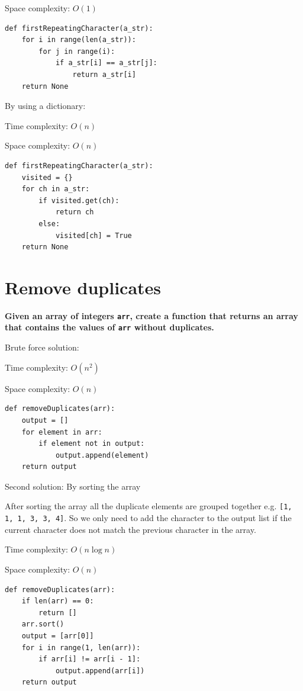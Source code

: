 \documentclass[a4paper,11pt]{book}
\begin{document}
\noindent Space complexity: $O(1)$

\begin{lstlisting}
def firstRepeatingCharacter(a_str):
    for i in range(len(a_str)):
        for j in range(i):
            if a_str[i] == a_str[j]:
                return a_str[i]
    return None
\end{lstlisting}

\noindent By using a dictionary:

\noindent Time complexity: $O(n)$

\noindent Space complexity: $O(n)$

\begin{lstlisting}
def firstRepeatingCharacter(a_str):
    visited = {}
    for ch in a_str:
        if visited.get(ch):
            return ch
        else:
            visited[ch] = True
    return None
\end{lstlisting}

\newpage
\section{Remove duplicates}

\textbf{Given an array of integers \lstinline{arr}, create a function that returns an array that contains the values of \lstinline{arr} without duplicates.}
\vspace{5mm}

\noindent Brute force solution:

\noindent Time complexity: $O(n^2)$

\noindent Space complexity: $O(n)$

\begin{lstlisting}
def removeDuplicates(arr):
    output = []
    for element in arr:
        if element not in output:
            output.append(element)
    return output
\end{lstlisting}

\noindent Second solution: By sorting the array

After sorting the array all the duplicate elements are grouped together e.g. \lstinline{[1, 1, 1, 3, 3, 4]}. So we only need to add the character to the output list if the current character does not match the previous character in the array.

\noindent Time complexity: $O(n\log n)$

\noindent Space complexity: $O(n)$

\begin{lstlisting}
def removeDuplicates(arr):
    if len(arr) == 0:
        return []
    arr.sort()
    output = [arr[0]]
    for i in range(1, len(arr)):
        if arr[i] != arr[i - 1]:
            output.append(arr[i])
    return output
\end{lstlisting}
\end{document}
